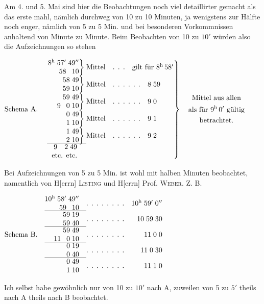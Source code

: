 Am 4. und 5. Mai sind hier die Beobachtungen noch viel detaillirter gemacht
als das erste mahl, nämlich durchweg von 10 zu 10 Minuten, ja wenigstens
zur Hälfte noch enger, nämlich von 5 zu 5 Min. und bei besonderen
Vorkommnissen anhaltend von Minute zu Minute. Beim Beobachten von 10
zu \(10'\) würden also die Aufzeichnungen so stehen
\clearpage{}
\newcommand{\LTimePair}[6]{\begin{array}{@{}r@{\;}r@{\;}r@{}}#1&#2&#3\\#4&#5&#6\end{array}}
\begin{center}\small
\(\text{Schema A.}\quad
\left.\begin{array}{@{}r@{\;}l@{\quad}l@{}}
\left.\LTimePair{8^{\mathrm{h}}}{57'}{49''}{}{58}{10}\right\}&\text{Mittel}&\text{. . .}\quad\text{gilt für }8^{\mathrm{h}}\,58'\\[.7ex]
\left.\LTimePair{}{58}{49}{}{59}{10}\right\}&\text{Mittel}&\text{. . . . . .}\quad8\;59\\[.7ex]
\left.\LTimePair{}{59}{49}{9}{0}{10}\right\}&\text{Mittel}&\text{. . . . . .}\quad9\;0\\[.7ex]
\left.\LTimePair{}{0}{49}{}{1}{10}\right\}&\text{Mittel}&\text{. . . . . .}\quad9\;1\\[.7ex]
\left.\LTimePair{}{1}{49}{}{2}{10}\right\}&\text{Mittel}&\text{. . . . . .}\quad9\;2\\[-.5ex]
\cline{1-1}
9\quad2\;49\quad&&\\
\text{etc. etc.}\quad&&
\end{array}\right\}\quad
\begin{gathered}\text{Mittel aus allen}\\\text{als für }9^{\mathrm{h}}\,0'\text{ gültig}\\\text{betrachtet.}\end{gathered}\)
\end{center}
\noindent\hspace*{\parindent}Bei Aufzeichnungen von 5 zu 5 Min. ist wohl mit halben Minuten beobachtet,
namentlich von H[errn] \textsc{Listing} und H[errn] Prof. \textsc{Weber}. Z. B.
\begin{center}\small
\(\text{Schema B.}\quad
\begin{array}{@{}r@{\quad}c@{\quad}r@{}}
\LTimePair{10^{\mathrm{h}}}{58'}{49''}{}{59}{10}&\text{. . . . . . . .}&10^{\mathrm{h}}\;59'\;0''\\[-.5ex]\cline{1-1}
\LTimePair{}{59}{19}{}{59}{40}&\text{. . . . . . . .}&10\;59\;30\\[-.5ex]\cline{1-1}
\LTimePair{}{59}{49}{11}{0}{10}&\text{. . . . . . . .}&11\;0\;0\\[-.5ex]\cline{1-1}
\LTimePair{}{0}{19}{}{0}{40}&\text{. . . . . . . .}&11\;0\;30\\[-.5ex]\cline{1-1}
\LTimePair{}{0}{49}{}{1}{10}&\text{. . . . . . . .}&11\;1\;0
\end{array}\)
\end{center}
\noindent Ich selbst habe gewöhnlich nur von 10 zu \(10'\) nach A, zuweilen von 5 zu \(5'\)
theils nach A theils nach B beobachtet.

